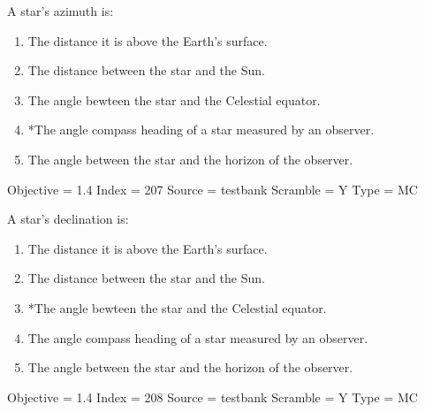 \documentclass[11pt]{article}
\begin{document}
\begin{enumerate}
\begin{minipage}{\textwidth}
\begin{minipage}{\textwidth}
\item A star's azimuth is:
\begin{enumerate} 
\setlength{\itemsep}{1pt} 
\setlength{\parskip}{0pt} 
\setlength{\parsep}{0pt}
\setlength{\multicolsep}{1pt} 
\item The distance it is above the Earth's surface.
\item The distance between the star and the Sun.
\item The angle bewteen the star and the Celestial equator.
\item *The angle compass heading of a star measured by an observer.
\item The angle between the star and the horizon of the observer.
\end{enumerate} 
Objective = 1.4
Index = 207
Source = testbank
Scramble = Y
Type = MC
\end{minipage}
\end{minipage}
\vskip 0.20in

\begin{minipage}{\textwidth}
\begin{minipage}{\textwidth}
\item A star's declination is:
\begin{enumerate} 
\setlength{\itemsep}{1pt} 
\setlength{\parskip}{0pt} 
\setlength{\parsep}{0pt}
\setlength{\multicolsep}{1pt} 
\item The distance it is above the Earth's surface.
\item The distance between the star and the Sun.
\item *The angle bewteen the star and the Celestial equator.
\item The angle compass heading of a star measured by an observer.
\item The angle between the star and the horizon of the observer.
\end{enumerate} 
Objective = 1.4
Index = 208
Source = testbank
Scramble = Y
Type = MC
\end{minipage}
\end{minipage}
\vskip 0.20in


\end{enumerate}
\end{document}
